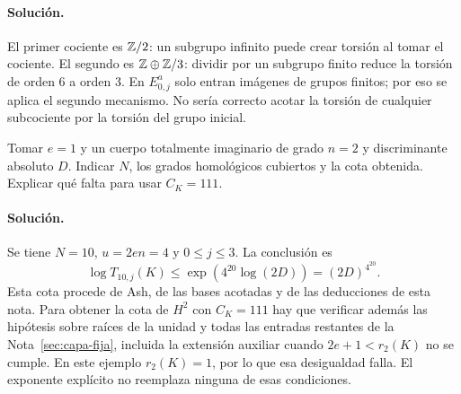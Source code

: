 \paragraph{Solución.}
El primer cociente es $\mathbb{Z}/2$: un subgrupo infinito puede
crear torsión al tomar el cociente.
El segundo es $\mathbb{Z}\oplus\mathbb{Z}/3$: dividir por un subgrupo
finito reduce la torsión de orden $6$ a orden $3$.
En $E^a_{0,j}$ solo entran imágenes de grupos finitos;
por eso se aplica el segundo mecanismo. No sería correcto
acotar la torsión de cualquier subcociente por la torsión
del grupo inicial.

\begin{ejercicio}
Tomar $e=1$ y un cuerpo totalmente imaginario de grado
$n=2$ y discriminante absoluto $D$.
Indicar $N$, los grados homológicos cubiertos y la cota
obtenida. Explicar qué falta para usar $C_K=111$.
\end{ejercicio}

\paragraph{Solución.}
Se tiene $N=10$, $u=2en=4$ y $0\le j\le3$.
La conclusión es
\[
 \log T_{10,j}(K)\le\exp\!\left(4^{20}\log(2D)\right)
                   =(2D)^{4^{20}}.
\]
Esta cota procede de Ash, de las bases acotadas y de las
deducciones de esta nota. Para obtener la cota de $H^2$
con $C_K=111$ hay que verificar además las hipótesis sobre
raíces de la unidad y todas las entradas restantes de la
Nota~\ref{sec:capa-fija}, incluida la extensión auxiliar
cuando $2e+1<r_2(K)$ no se cumple. En este ejemplo
$r_2(K)=1$, por lo que esa desigualdad falla.
El exponente explícito no reemplaza ninguna de esas condiciones.
